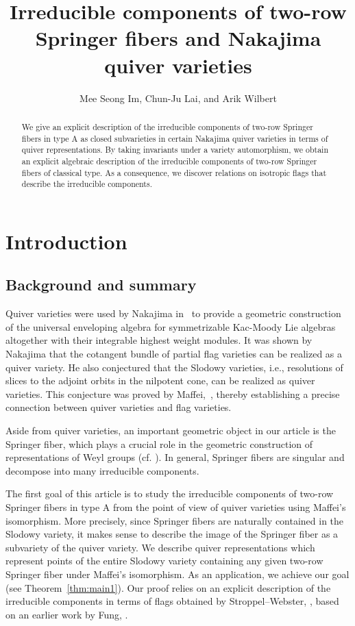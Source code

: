 \documentclass[11pt,reqno]{amsart}
\title{Irreducible components of two-row Springer fibers and Nakajima quiver varieties}
\author[M.S. Im, C. Lai, and A. Wilbert]{Mee Seong Im,  Chun-Ju Lai, and Arik Wilbert}
\numberwithin{equation}{section}
\theoremstyle{definition}
\begin{document}
\begin{abstract}
We give an explicit description of the irreducible components of two-row Springer fibers in type A as closed subvarieties in certain Nakajima quiver varieties in terms of quiver representations. 
By taking invariants under a variety automorphism, we obtain an explicit algebraic description of the irreducible components of two-row Springer fibers of classical type.
As a consequence, we discover relations on isotropic flags that describe the irreducible components.

\end{abstract}
 
\maketitle 

\section{Introduction}
\subsection{Background and summary} \label{sec:background}
Quiver varieties were used by 
Nakajima in~\cite{Na94, Nak98} to provide a geometric construction of the universal enveloping algebra for symmetrizable Kac-Moody Lie algebras altogether with their integrable highest weight modules.  
It was shown by Nakajima that the cotangent bundle of partial flag varieties can be realized as a quiver variety.
He also conjectured that the Slodowy varieties, i.e., resolutions of slices to the adjoint orbits in the nilpotent cone, can be realized as quiver varieties. 
This conjecture was proved by Maffei,~\cite[Theorem~8]{Maf05}, 
thereby establishing a precise connection between quiver varieties and flag varieties. 

Aside from quiver varieties, an important geometric object in our article is the Springer fiber, which plays a crucial role in the geometric construction of representations of Weyl groups (cf. \cite{Spr76, Spr78}). 
In general, Springer fibers are singular and decompose into many irreducible components.
  
The first goal of this article is to study the irreducible components of two-row Springer fibers in type A from the point of view of quiver varieties using Maffei's isomorphism. More precisely, since Springer fibers are naturally contained in the Slodowy variety, it makes sense to describe the image of the Springer fiber as a subvariety of the quiver variety. 
We  describe  quiver representations which represent points of the entire Slodowy variety containing any given two-row Springer fiber  under Maffei's isomorphism.
As an application, we achieve our goal (see Theorem~\ref{thm:main1}). Our proof relies on an explicit description of the irreducible components in terms of flags obtained by Stroppel--Webster, \cite{SW12}, based on an earlier work by Fung, \cite{Fun03}. 
\end{document}

